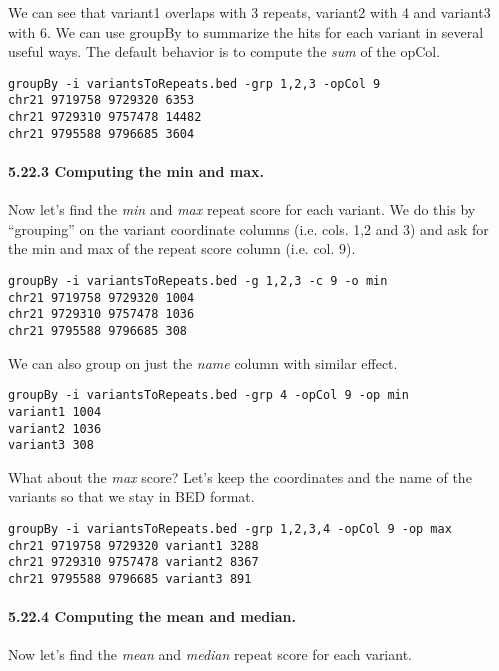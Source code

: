 \documentclass[letterpaper,10pt,english]{sphinxmanual}
\begin{document}
We can see that variant1 overlaps with 3 repeats, variant2 with 4 and variant3 with 6. We can use
groupBy to summarize the hits for each variant in several useful ways. The default behavior is to
compute the \emph{sum} of the opCol.

\begin{Verbatim}[commandchars=\\\{\}]
groupBy -i variantsToRepeats.bed -grp 1,2,3 -opCol 9
chr21 9719758 9729320 6353
chr21 9729310 9757478 14482
chr21 9795588 9796685 3604
\end{Verbatim}


\paragraph{5.22.3 Computing the min and max.}
\label{content/groupBy:computing-the-min-and-max}
Now let's find the \emph{min} and \emph{max} repeat score for each variant. We do this by ``grouping'' on the variant
coordinate columns (i.e. cols. 1,2 and 3) and ask for the min and max of the repeat score column (i.e.
col. 9).

\begin{Verbatim}[commandchars=\\\{\}]
groupBy -i variantsToRepeats.bed -g 1,2,3 -c 9 -o min
chr21 9719758 9729320 1004
chr21 9729310 9757478 1036
chr21 9795588 9796685 308
\end{Verbatim}

We can also group on just the \emph{name} column with similar effect.

\begin{Verbatim}[commandchars=\\\{\}]
groupBy -i variantsToRepeats.bed -grp 4 -opCol 9 -op min
variant1 1004
variant2 1036
variant3 308
\end{Verbatim}

What about the \emph{max} score? Let's keep the coordinates and the name of the variants so that we
stay in BED format.

\begin{Verbatim}[commandchars=\\\{\}]
groupBy -i variantsToRepeats.bed -grp 1,2,3,4 -opCol 9 -op max
chr21 9719758 9729320 variant1 3288
chr21 9729310 9757478 variant2 8367
chr21 9795588 9796685 variant3 891
\end{Verbatim}


\paragraph{5.22.4 Computing the mean and median.}
\label{content/groupBy:computing-the-mean-and-median}
Now let's find the \emph{mean} and \emph{median} repeat score for each variant.
\end{document}
